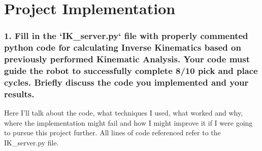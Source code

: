 \documentclass{article}
\begin{document}
\section{Project Implementation}

\subsubsection{1. Fill in the `IK\_server.py` file with properly commented python code for calculating Inverse Kinematics based on previously performed Kinematic Analysis. Your code must guide the robot to successfully complete 8/10 pick and place cycles. Briefly discuss the code you implemented and your results.}


Here I'll talk about the code, what techniques I used, what worked and why, where the implementation might fail and how I might improve it if I were going to pursue this project further. All lines of code referenced refer to the IK\_server.py file. \\
\end{document}
